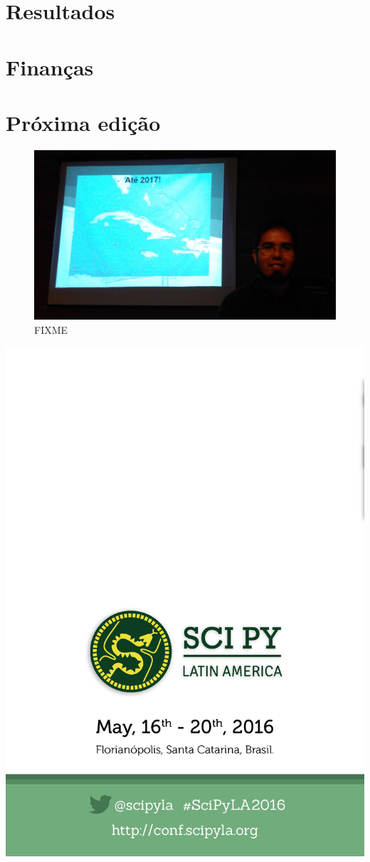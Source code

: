 \documentclass[12pt]{article}
\begin{document}
\newpage

\section*{Resultados}

\newpage

\section*{Finanças}

\newpage

\section*{Próxima edição}

\begin{figure}[!htb]
\center
\includegraphics[height=.3\textheight]{2017.jpg}
\caption{FIXME}
\end{figure}

\newpage

\thispagestyle{empty}
\noindent  %
\includegraphics{../../assets/contra-capa}
\NoBgThispage
\end{document}
